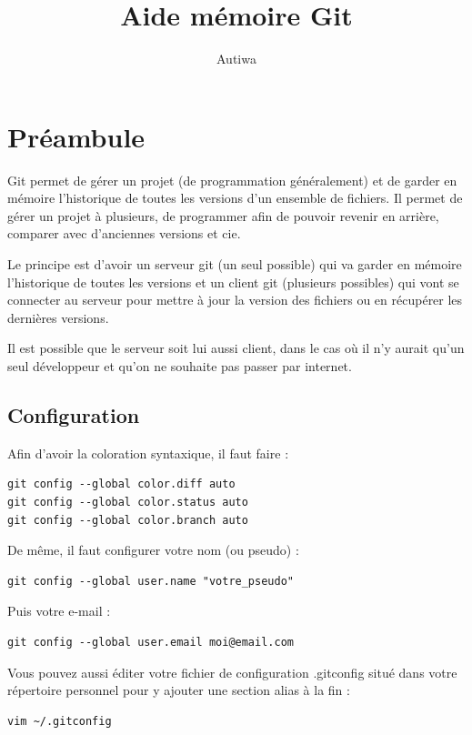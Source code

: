 \documentclass[a4paper,twoside]{article}
\title{Aide mémoire Git}
\author{Autiwa}
\begin{document}

\cleardoublepage

\tableofcontents

\clearpage

\section{Préambule}
Git permet de gérer un projet (de programmation généralement) et de garder en mémoire l'historique de toutes les versions d'un ensemble de fichiers. Il permet de gérer un projet à plusieurs, de programmer afin de pouvoir revenir en arrière, comparer avec d'anciennes versions et cie. 

Le principe est d'avoir un serveur git (un seul possible) qui va garder en mémoire l'historique de toutes les versions et un client git (plusieurs possibles) qui vont se connecter au serveur pour mettre à jour la version des fichiers ou en récupérer les dernières versions.

\begin{remarque}
Il est possible que le serveur soit lui aussi client, dans le cas où il n'y aurait qu'un seul développeur et qu'on ne souhaite pas passer par internet.
\end{remarque}

\subsection{Configuration}
Afin d'avoir la coloration syntaxique, il faut faire : 
\begin{verbatim}
git config --global color.diff auto
git config --global color.status auto
git config --global color.branch auto
\end{verbatim}

De même, il faut configurer votre nom (ou pseudo) :
\begin{verbatim}
git config --global user.name "votre_pseudo"
\end{verbatim}


Puis votre e-mail :
\begin{verbatim}
git config --global user.email moi@email.com
\end{verbatim}


Vous pouvez aussi éditer votre fichier de configuration .gitconfig situé dans votre répertoire personnel pour y ajouter une section alias à la fin :
\begin{verbatim}
vim ~/.gitconfig
\end{verbatim}
\end{document}
